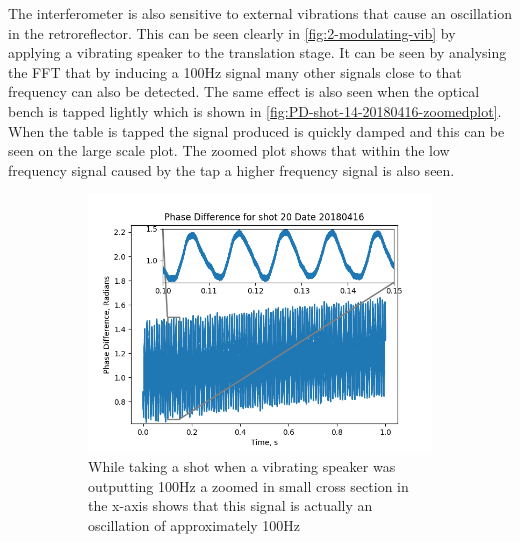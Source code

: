 \documentclass[12pt,a4paper,oneside]{report}
\begin{document}
The interferometer is also sensitive to external vibrations that cause an oscillation in the retroreflector. This can be seen clearly in \autoref{fig:2-modulating-vib} by applying a vibrating speaker to the translation stage. It can be seen by analysing the FFT that by inducing a 100Hz signal many other signals close to that frequency can also be detected. The same effect is also seen when the optical bench is tapped lightly which is shown in \autoref{fig:PD-shot-14-20180416-zoomedplot}. When the table is tapped the signal produced is quickly damped and this can be seen on the large scale plot. The zoomed plot shows that within the low frequency signal caused by the tap a higher frequency signal is also seen. 

\begin{figure}[H]
  \begin{subfigure}{.5\textwidth}
    \centering\captionsetup{width=.9\linewidth}
    \includegraphics[width=\textwidth,angle=0]{DImages/PD_-_shot_20_-_20180416_-_zoomed_plot_-_100Hz_speaker.png}
    \caption{While taking a shot when a vibrating speaker was outputting 100Hz a zoomed in small cross section in the x-axis shows that this signal is actually an oscillation of approximately 100Hz}
  \end{subfigure}
  \begin{subfigure}{.5\textwidth}
    \centering\captionsetup{width=.9\linewidth}

\end{subfigure}
\end{figure}
\end{document}
